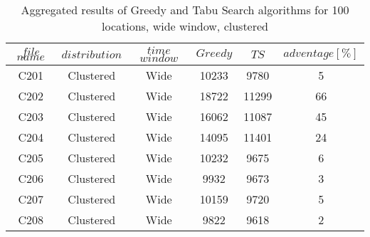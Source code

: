 \begin{table}[t]
\centering
\caption{
Aggregated results of Greedy and Tabu Search algorithms for 100 locations, wide window, clustered}
\begin{tabular*}{0.8\linewidth}{@{\extracolsep{\fill}}cccccc}
\toprule
$file$ $name$ & $distribution$ & $time$ $window$ & $Greedy$ & $TS$ & $adventage[\%]$ \\ \midrule
C201 & Clustered & Wide & 10233 & 9780 & 5\\
C202 & Clustered & Wide & 18722 & 11299 & 66\\
C203 & Clustered & Wide & 16062 & 11087 & 45\\
C204 & Clustered & Wide & 14095 & 11401 & 24\\
C205 & Clustered & Wide & 10232 & 9675 & 6\\
C206 & Clustered & Wide & 9932 & 9673 & 3\\
C207 & Clustered & Wide & 10159 & 9720 & 5\\
C208 & Clustered & Wide & 9822 & 9618 & 2\\
\end{tabular*}\end{table}